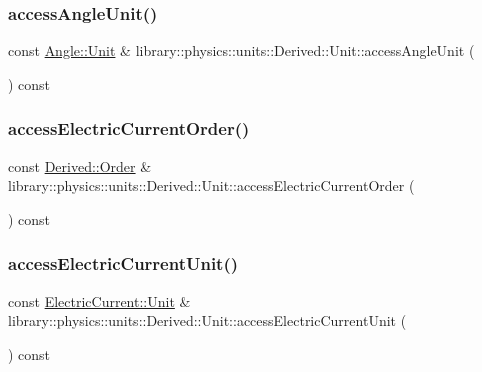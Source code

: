 \subsubsection{\texorpdfstring{access\+Angle\+Unit()}{accessAngleUnit()}}
{\footnotesize\ttfamily const \hyperlink{classlibrary_1_1physics_1_1units_1_1_angle_a3c329d415a61783b16ce481874cc5956}{Angle\+::\+Unit} \& library\+::physics\+::units\+::\+Derived\+::\+Unit\+::access\+Angle\+Unit (\begin{DoxyParamCaption}{ }\end{DoxyParamCaption}) const}

\mbox{\label{classlibrary_1_1physics_1_1units_1_1_derived_1_1_unit_aed0c89d08564dbc2ba7c29497bfc5f55}} 
\subsubsection{\texorpdfstring{access\+Electric\+Current\+Order()}{accessElectricCurrentOrder()}}
{\footnotesize\ttfamily const \hyperlink{classlibrary_1_1physics_1_1units_1_1_derived_1_1_order}{Derived\+::\+Order} \& library\+::physics\+::units\+::\+Derived\+::\+Unit\+::access\+Electric\+Current\+Order (\begin{DoxyParamCaption}{ }\end{DoxyParamCaption}) const}

\mbox{\label{classlibrary_1_1physics_1_1units_1_1_derived_1_1_unit_a83d21cf2abde1e55c5e29c9e37541b29}} 
\subsubsection{\texorpdfstring{access\+Electric\+Current\+Unit()}{accessElectricCurrentUnit()}}
{\footnotesize\ttfamily const \hyperlink{classlibrary_1_1physics_1_1units_1_1_electric_current_a9498eabf964f0ae6116eb627b4ec5233}{Electric\+Current\+::\+Unit} \& library\+::physics\+::units\+::\+Derived\+::\+Unit\+::access\+Electric\+Current\+Unit (\begin{DoxyParamCaption}{ }\end{DoxyParamCaption}) const}


